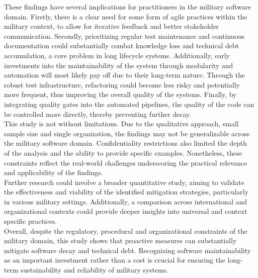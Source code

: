 These findings have several implications for practitioners in the military software domain. Firstly, there is a clear need for some form of agile practices within the military context, to allow for iterative feedback and better stakeholder communication.
Secondly, prioritizing regular test maintenance and continuous documentation could substantially combat knowledge loss and technical debt accumulation, a core problem in long lifecycle systems.
Additionally, early investments into the maintainability of the system through modularity and automation will most likely pay off due to their long-term nature.
Through the robust test infrastructure, refactoring could become less risky and potentially more frequent, thus improving the overall quality of the systems.
Finally, by integrating quality gates into the automated pipelines, the quality of the code can be controlled more directly, thereby preventing further decay.\\

This study is not without limitations. Due to the qualitative approach, small sample size and single organization, the findings may not be generalizable across the military software domain. Confidentiality restrictions also limited the depth of the analysis and the ability to provide specific examples.
Nonetheless, these constraints reflect the real-world challenges underscoring the practical relevance and applicability of the findings.\\

Further research could involve a broader quantitative study, aiming to validate the effectiveness and viability of the identified mitigation strategies, particularly in various military settings.
Additionally, a comparison across international and organizational contexts could provide deeper insights into universal and context specific practices.\\

Overall, despite the regulatory, procedural and organizational constraints of the military domain, this study shows that proactive measures can substantially mitigate software decay and technical debt.
Recognizing software maintainability as an important investment rather than a cost is crucial for ensuring the long-term sustainability and reliability of military systems.
